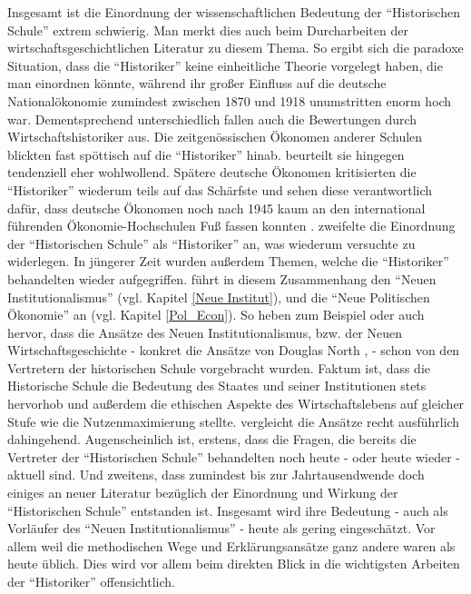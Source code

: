 Insgesamt ist die Einordnung der wissenschaftlichen Bedeutung der "`Historischen Schule"' extrem schwierig. Man merkt dies auch beim Durcharbeiten der wirtschaftsgeschichtlichen Literatur zu diesem Thema. So ergibt sich die paradoxe Situation, dass die "`Historiker"' keine einheitliche Theorie vorgelegt haben, die man einordnen könnte, während ihr großer Einfluss auf die deutsche Nationalökonomie zumindest zwischen 1870 und 1918 unumstritten enorm hoch war. Dementsprechend unterschiedlich fallen auch die Bewertungen durch Wirtschaftshistoriker aus. Die zeitgenössischen Ökonomen anderer Schulen blickten fast spöttisch auf die "`Historiker"' hinab. \textcite{Schumpeter1954} beurteilt sie hingegen tendenziell eher wohlwollend. Spätere deutsche Ökonomen kritisierten die "`Historiker"' wiederum teils auf das Schärfste und sehen diese verantwortlich dafür, dass deutsche Ökonomen noch nach 1945 kaum an den international führenden Ökonomie-Hochschulen Fuß fassen konnten \parencite[S. 115f]{Winkel1989}. \textcite{Pearson1999} zweifelte die Einordnung der "`Historischen Schule"' als "`Historiker"' an, was wiederum \textcite{Caldwell2001} versuchte zu widerlegen. In jüngerer Zeit wurden außerdem Themen, welche die "`Historiker"' behandelten wieder aufgegriffen. \textcite[S. 210]{Rosner2012} führt in diesem Zusammenhang den "`Neuen Institutionalismus"' (vgl. Kapitel \ref{Neue Institut}), und die "`Neue Politischen Ökonomie"' an (vgl. Kapitel \ref{Pol_Econ}). So heben zum Beispiel \textcite{Wischermann1993} oder auch \textcite{Plumpe1999} hervor, dass die Ansätze des Neuen Institutionalismus, bzw. der Neuen Wirtschaftsgeschichte - konkret die Ansätze von Douglas North \parencite[S. 243]{Wischermann1993}, \parencite[S. 257]{Plumpe1999} - schon von den Vertretern der historischen Schule vorgebracht wurden. Faktum ist, dass die Historische Schule die Bedeutung des Staates und seiner Institutionen stets hervorhob und außerdem die ethischen Aspekte des Wirtschaftslebens auf gleicher Stufe wie die Nutzenmaximierung stellte. \textcite{Richter1996} vergleicht die Ansätze recht ausführlich dahingehend. Augenscheinlich ist, erstens, dass die Fragen, die bereits die Vertreter der "`Historischen Schule"' behandelten noch heute - oder heute wieder - aktuell sind. Und zweitens, dass zumindest bis zur Jahrtausendwende doch einiges an neuer Literatur bezüglich der Einordnung und Wirkung der "`Historischen Schule"' entstanden ist. Insgesamt wird ihre Bedeutung - auch als Vorläufer des "`Neuen Institutionalismus"' - heute als gering eingeschätzt. Vor allem weil die methodischen Wege und Erklärungsansätze ganz andere waren als heute üblich. Dies wird vor allem beim direkten Blick in die wichtigsten Arbeiten der "`Historiker"' offensichtlich. 
